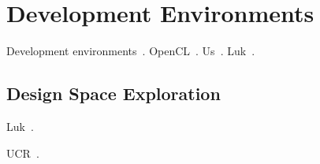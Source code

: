 \section{Development Environments}
\label{sec:dev}

Development environments~\cite{mlk12}.
OpenCL~\cite{Ahmed11}.
Us~\cite{blc17,cft+10,ctg+07,ftb+06,wcc12,wcc13}.
Luk~\cite{ttpl11}.

\subsection{Design Space Exploration}

Luk~\cite{ll12,ll11,slkk13}.

UCR~\cite{bbg13}.
